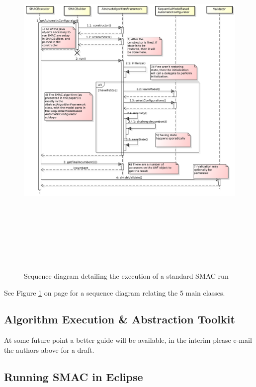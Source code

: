 \documentclass[manual.tex]{subfiles}
\begin{document}
\begin{figure}[h]
\includegraphics[height=18cm,angle=0, trim=2.5cm 0cm 0cm 0cm clip=true]{sequence.png} 
\caption{Sequence diagram detailing the execution of a standard SMAC run}
\label{sequence}
\end{figure}

See Figure \ref{sequence} on page \pageref{sequence} for a sequence diagram relating the 5 main classes.

\subsection{Algorithm Execution \& Abstraction Toolkit}

At some future point a better guide will be available, in the interim please e-mail the authors above for a draft.

\subsection{Running SMAC in Eclipse}
\end{document}
